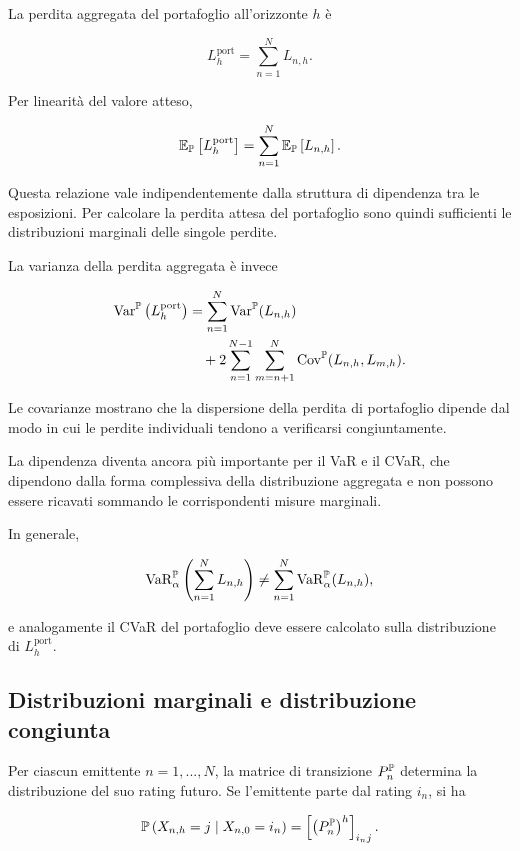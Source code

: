 La perdita aggregata del portafoglio all'orizzonte $h$ \`{e}

\[
L_h^{\mathrm{port}}
=
\sum_{n=1}^{N}
L_{n,h}.
\]

Per linearit\`{a} del valore atteso,

\[
\mathbb{E}_{\mathbb{P}}
\left[
L_h^{\mathrm{port}}
\right]
=
\sum_{n=1}^{N}
\mathbb{E}_{\mathbb{P}}
\left[
L_{n,h}
\right].
\]

Questa relazione vale indipendentemente dalla struttura di dipendenza
tra le esposizioni. Per calcolare la perdita attesa del portafoglio
sono quindi sufficienti le distribuzioni marginali delle singole
perdite.

La varianza della perdita aggregata \`{e} invece

\[
\begin{split}
\operatorname{Var}^{\mathbb{P}}
\left(
L_h^{\mathrm{port}}
\right)
&=
\sum_{n=1}^{N}
\operatorname{Var}^{\mathbb{P}}(L_{n,h})
\\
&\quad
+
2
\sum_{n=1}^{N-1}
\sum_{m=n+1}^{N}
\operatorname{Cov}^{\mathbb{P}}(L_{n,h},L_{m,h}).
\end{split}
\]

Le covarianze mostrano che la dispersione della perdita di portafoglio
dipende dal modo in cui le perdite individuali tendono a verificarsi
congiuntamente.

La dipendenza diventa ancora pi\`{u} importante per il VaR e il CVaR,
che dipendono dalla forma complessiva della distribuzione aggregata e
non possono essere ricavati sommando le corrispondenti misure
marginali.

In generale,

\[
\operatorname{VaR}_{\alpha}^{\mathbb{P}}
\left(
\sum_{n=1}^{N}L_{n,h}
\right)
\neq
\sum_{n=1}^{N}
\operatorname{VaR}_{\alpha}^{\mathbb{P}}(L_{n,h}),
\]

e analogamente il CVaR del portafoglio deve essere calcolato sulla
distribuzione di $L_h^{\mathrm{port}}$.

\subsection{Distribuzioni marginali e distribuzione congiunta}

\label{subsec:cap9-marginali-congiunta}

Per ciascun emittente $n=1,...,N$, la matrice di transizione
$P_n^{\mathbb{P}}$ determina la distribuzione del suo rating futuro. Se
l'emittente parte dal rating $i_n$, si ha

\[
\mathbb{P}
\left(
X_{n,h}=j
\mid
X_{n,0}=i_n
\right)
=
\left[
\left(P_n^{\mathbb{P}}\right)^h
\right]_{i_nj}.
\]

